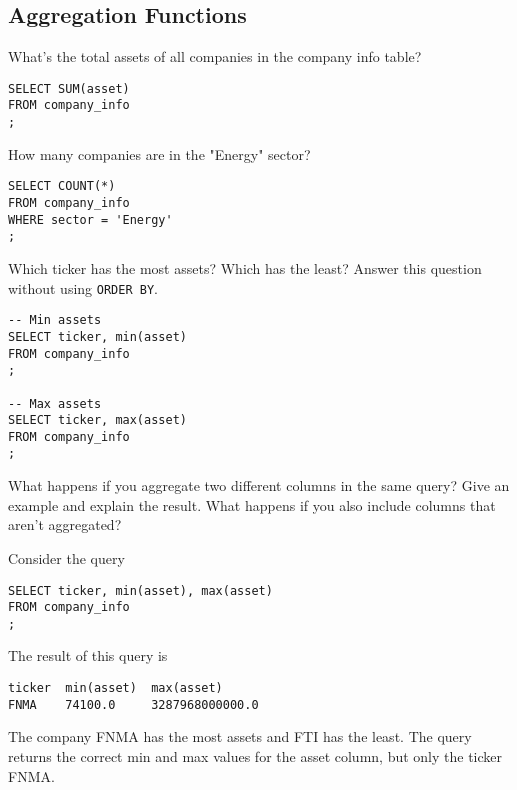 \documentclass[10pt]{exam}
\begin{document}
\begin{questions}

\subsection*{Aggregation Functions}

\question What's the total assets of all companies in the company info table?

\begin{solution}
\begin{lstlisting}
SELECT SUM(asset)
FROM company_info
;
\end{lstlisting}
\end{solution}


\question How many companies are in the "Energy" sector?

\begin{solution}
\begin{lstlisting}
SELECT COUNT(*)
FROM company_info
WHERE sector = 'Energy'
;
\end{lstlisting}
\end{solution}


\question Which ticker has the most assets? Which has the least? Answer this
question without using \lstinline{ORDER BY}.

\begin{solution}
\begin{lstlisting}
-- Min assets
SELECT ticker, min(asset)
FROM company_info
;

-- Max assets
SELECT ticker, max(asset)
FROM company_info
;
\end{lstlisting}
\end{solution}


\question What happens if you aggregate two different columns in the same
query? Give an example and explain the result. What happens if you also include
columns that aren't aggregated?

\begin{solution}
Consider the query
\begin{lstlisting}
SELECT ticker, min(asset), max(asset)
FROM company_info
;
\end{lstlisting}
The result of this query is
\begin{lstlisting}
ticker  min(asset)  max(asset)
FNMA    74100.0     3287968000000.0
\end{lstlisting}
The company FNMA has the most assets and FTI has the least. The query returns
the correct min and max values for the asset column, but only the ticker FNMA.


\end{solution}
\end{questions}
\end{document}
